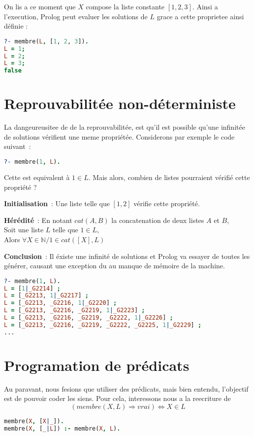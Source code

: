On lis a ce moment que $X$ compose la liste constante $[1, 2, 3]$. Ainsi a
l'execution, Prolog peut evaluer les solutions de $L$ grace a cette proprietee
ainsi définie :

\begin{lstlisting}[language=Prolog]
?- membre(L, [1, 2, 3]).
L = 1;
L = 2;
L = 3;
false
\end{lstlisting}


\section{Reprouvabilitée non-déterministe}

La dangeureusitee de de la reprouvabilitée, est qu'il est possible qu'une
infinitée de solutions vérifient une meme propriétée. Considerons par exemple
le code suivant~:

\begin{lstlisting}[language=Prolog]
?- membre(1, L).
\end{lstlisting}

Cette est equivalent à $1 \in L$. Mais alors, combien de listes
pourraient vérifié cette propriété ?

\textbf{Initialisation}~: Une liste telle que $[1, 2]$ vérifie cette propriété.

\textbf{Hérédité}~: En notant $cat(A, B)$ la concatenation de deux listes $A$ et
$B$,\\
Soit une liste $L$ telle que $1 \in L$,\\
Alors $\forall X \in \mathbb{N} / 1 \in cat([X], L)$

\textbf{Conclusion}~: Il éxiste une infinité de solutions et Prolog va essayer
de toutes les générer, causant une exception du au manque de mémoire de la
machine.

\begin{lstlisting}[language=Prolog]
?- membre(1, L).
L = [1|_G2214] ;
L = [_G2213, 1|_G2217] ;
L = [_G2213, _G2216, 1|_G2220] ;
L = [_G2213, _G2216, _G2219, 1|_G2223] ;
L = [_G2213, _G2216, _G2219, _G2222, 1|_G2226] ;
L = [_G2213, _G2216, _G2219, _G2222, _G2225, 1|_G2229] ;
...
\end{lstlisting}


\section{Programation de prédicats}

Au paravant, nous fesions que utiliser des prédicats, mais bien entendu,
l'objectif est de pouvoir coder les siens. Pour cela, interessons nous a la
reecriture de
\[(membre(X, L) \Rightarrow vrai) \Leftrightarrow X \in L\]

\begin{lstlisting}[language=Prolog]
membre(X, [X|_]).
membre(X, [_|L]) :- membre(X, L).
\end{lstlisting}
